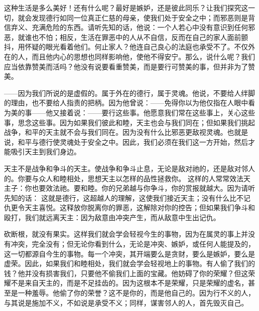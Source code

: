 这种生活是多么美好！还有什么呢？最好是嫉妒，还是彼此同乐？让我们探究这一切，就会发现德行如同一位真正仁慈的母亲，使我们处于安全之中；而邪恶则是背信弃义、充满危险的东西。请听先知的话，他说：一个人若心中没有意识到任何邪恶，就谁也不怕；相反，生活在罪恶中的人从不自信，反而在自己的家人面前颤抖，用怀疑的眼光看着他们。何止家人？他连自己良心的法庭也承受不了。不仅外在的人，而且他内心的思想也同样影响他，使他不得安宁。那么，说什么呢？我们应当依靠赞美而活吗？他没有说要看重赞美，而是要行可赞美的事，但并非为了赞美。\par

——因为我们所说的是虚假的。属于外在的德行，属于灵魂。他说，不要给人绊脚的理由，也不要给人指责的把柄。因为他曾说：——免得你以为他仅指在人眼中看为美的事——他又接着说：——要行这些事。他愿意我们常在这些事上，关心这些事，思念这些事。因为如果我们彼此和睦，天主也会与我们同在；但如果我们挑起战争，和平的天主就不会与我们同在。因为没有什么比邪恶更敌视灵魂。也就是说，和平与德行使灵魂处于安全之中。因此，我们必须在我们这一方开始，然后才能吸引天主到我们身边。\par

天主不是战争和争斗的天主。使战争和争斗止息，无论是敌对祂的，还是敌对邻人的。你要与众人和睦相处，思想天主以怎样的品性拯救你。 这样的人常常效法天主子：你也要效法祂。要和睦。你的兄弟越与你争斗，你的赏报就越大。因为请听先知的话： 这就是德行，这超越人的理解，这使我们接近天主；没有什么比不记仇更令天主喜悦。这释放你脱离你的罪恶，这解除对你的控告；但如果我们争斗和殴打，我们就远离天主：因为敌意由冲突产生，而从敌意中生出记仇。\par

砍断根，就没有果实。这样我们就会学会轻视今生的事物，因为在属灵的事上并没有冲突，完全没有；但无论你看到什么，无论是冲突、嫉妒，或任何人能提及的，这一切都源自今生的事物。每一个冲突，其开端要么是贪财，要么是嫉妒，要么是虚荣。因此，如果我们和睦相处，我们就会学会轻视地上的事物。有人偷了我们的钱？他并没有损害我们，只要他不偷我们上面的宝藏。他妨碍了你的荣耀？但这荣耀不是来自天主的，而是不足挂齿的。因为这根本不是荣耀，只是荣耀的虚名，甚至是一种羞辱。他偷了你的荣誉？这不是你的，而是他自己的。因为行不义的人，与其说是施加不义，不如说是承受不义；同样，谋害邻人的人，首先毁灭自己。\par

